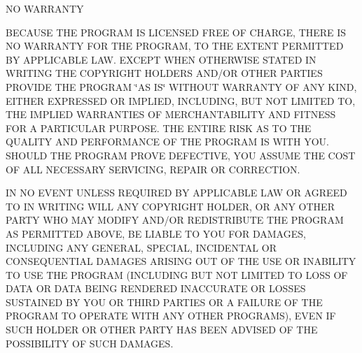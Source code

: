 N\+O W\+A\+R\+R\+A\+N\+T\+Y


\begin{DoxyEnumerate}
\item B\+E\+C\+A\+U\+S\+E T\+H\+E P\+R\+O\+G\+R\+A\+M I\+S L\+I\+C\+E\+N\+S\+E\+D F\+R\+E\+E O\+F C\+H\+A\+R\+G\+E, T\+H\+E\+R\+E I\+S N\+O W\+A\+R\+R\+A\+N\+T\+Y F\+O\+R T\+H\+E P\+R\+O\+G\+R\+A\+M, T\+O T\+H\+E E\+X\+T\+E\+N\+T P\+E\+R\+M\+I\+T\+T\+E\+D B\+Y A\+P\+P\+L\+I\+C\+A\+B\+L\+E L\+A\+W. E\+X\+C\+E\+P\+T W\+H\+E\+N O\+T\+H\+E\+R\+W\+I\+S\+E S\+T\+A\+T\+E\+D I\+N W\+R\+I\+T\+I\+N\+G T\+H\+E C\+O\+P\+Y\+R\+I\+G\+H\+T H\+O\+L\+D\+E\+R\+S A\+N\+D/\+O\+R O\+T\+H\+E\+R P\+A\+R\+T\+I\+E\+S P\+R\+O\+V\+I\+D\+E T\+H\+E P\+R\+O\+G\+R\+A\+M \char`\"{}\+A\+S I\+S\char`\"{} W\+I\+T\+H\+O\+U\+T W\+A\+R\+R\+A\+N\+T\+Y O\+F A\+N\+Y K\+I\+N\+D, E\+I\+T\+H\+E\+R E\+X\+P\+R\+E\+S\+S\+E\+D O\+R I\+M\+P\+L\+I\+E\+D, I\+N\+C\+L\+U\+D\+I\+N\+G, B\+U\+T N\+O\+T L\+I\+M\+I\+T\+E\+D T\+O, T\+H\+E I\+M\+P\+L\+I\+E\+D W\+A\+R\+R\+A\+N\+T\+I\+E\+S O\+F M\+E\+R\+C\+H\+A\+N\+T\+A\+B\+I\+L\+I\+T\+Y A\+N\+D F\+I\+T\+N\+E\+S\+S F\+O\+R A P\+A\+R\+T\+I\+C\+U\+L\+A\+R P\+U\+R\+P\+O\+S\+E. T\+H\+E E\+N\+T\+I\+R\+E R\+I\+S\+K A\+S T\+O T\+H\+E Q\+U\+A\+L\+I\+T\+Y A\+N\+D P\+E\+R\+F\+O\+R\+M\+A\+N\+C\+E O\+F T\+H\+E P\+R\+O\+G\+R\+A\+M I\+S W\+I\+T\+H Y\+O\+U. S\+H\+O\+U\+L\+D T\+H\+E P\+R\+O\+G\+R\+A\+M P\+R\+O\+V\+E D\+E\+F\+E\+C\+T\+I\+V\+E, Y\+O\+U A\+S\+S\+U\+M\+E T\+H\+E C\+O\+S\+T O\+F A\+L\+L N\+E\+C\+E\+S\+S\+A\+R\+Y S\+E\+R\+V\+I\+C\+I\+N\+G, R\+E\+P\+A\+I\+R O\+R C\+O\+R\+R\+E\+C\+T\+I\+O\+N.
\item I\+N N\+O E\+V\+E\+N\+T U\+N\+L\+E\+S\+S R\+E\+Q\+U\+I\+R\+E\+D B\+Y A\+P\+P\+L\+I\+C\+A\+B\+L\+E L\+A\+W O\+R A\+G\+R\+E\+E\+D T\+O I\+N W\+R\+I\+T\+I\+N\+G W\+I\+L\+L A\+N\+Y C\+O\+P\+Y\+R\+I\+G\+H\+T H\+O\+L\+D\+E\+R, O\+R A\+N\+Y O\+T\+H\+E\+R P\+A\+R\+T\+Y W\+H\+O M\+A\+Y M\+O\+D\+I\+F\+Y A\+N\+D/\+O\+R R\+E\+D\+I\+S\+T\+R\+I\+B\+U\+T\+E T\+H\+E P\+R\+O\+G\+R\+A\+M A\+S P\+E\+R\+M\+I\+T\+T\+E\+D A\+B\+O\+V\+E, B\+E L\+I\+A\+B\+L\+E T\+O Y\+O\+U F\+O\+R D\+A\+M\+A\+G\+E\+S, I\+N\+C\+L\+U\+D\+I\+N\+G A\+N\+Y G\+E\+N\+E\+R\+A\+L, S\+P\+E\+C\+I\+A\+L, I\+N\+C\+I\+D\+E\+N\+T\+A\+L O\+R C\+O\+N\+S\+E\+Q\+U\+E\+N\+T\+I\+A\+L D\+A\+M\+A\+G\+E\+S A\+R\+I\+S\+I\+N\+G O\+U\+T O\+F T\+H\+E U\+S\+E O\+R I\+N\+A\+B\+I\+L\+I\+T\+Y T\+O U\+S\+E T\+H\+E P\+R\+O\+G\+R\+A\+M (I\+N\+C\+L\+U\+D\+I\+N\+G B\+U\+T N\+O\+T L\+I\+M\+I\+T\+E\+D T\+O L\+O\+S\+S O\+F D\+A\+T\+A O\+R D\+A\+T\+A B\+E\+I\+N\+G R\+E\+N\+D\+E\+R\+E\+D I\+N\+A\+C\+C\+U\+R\+A\+T\+E O\+R L\+O\+S\+S\+E\+S S\+U\+S\+T\+A\+I\+N\+E\+D B\+Y Y\+O\+U O\+R T\+H\+I\+R\+D P\+A\+R\+T\+I\+E\+S O\+R A F\+A\+I\+L\+U\+R\+E O\+F T\+H\+E P\+R\+O\+G\+R\+A\+M T\+O O\+P\+E\+R\+A\+T\+E W\+I\+T\+H A\+N\+Y O\+T\+H\+E\+R P\+R\+O\+G\+R\+A\+M\+S), E\+V\+E\+N I\+F S\+U\+C\+H H\+O\+L\+D\+E\+R O\+R O\+T\+H\+E\+R P\+A\+R\+T\+Y H\+A\+S B\+E\+E\+N A\+D\+V\+I\+S\+E\+D O\+F T\+H\+E P\+O\+S\+S\+I\+B\+I\+L\+I\+T\+Y O\+F S\+U\+C\+H D\+A\+M\+A\+G\+E\+S.
\end{DoxyEnumerate}

